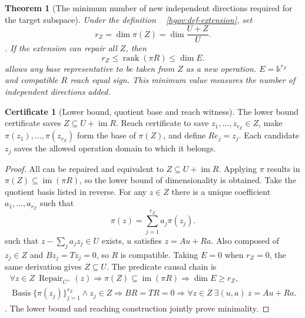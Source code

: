 \documentclass[12pt,a4paper,openany,notitlepage]{report}
\theoremstyle{plain}
\newtheorem{theorem}{Theorem}[chapter]
\theoremstyle{definition}
\newtheorem*{certificate}{Certificate}
\theoremstyle{remark}
\begin{document}
\begin{CJK*}
\begin{theorem}
[The minimum number of new independent directions required for the target subspace]\label{hgov:thm-minimal-extension}
Under the definition ~ \ref{hgov:def-extension}, set \[
 r_Z=\dim\pi(Z)
 =\dim\frac{U+Z}{U}.
\]. If the extension can repair all $Z$, then \[
 r_Z\le\operatorname{rank}(\pi R)\le\dim E.
\] allows any base representative to be taken from $Z$ as a new operation. $E=\mathbb k^{r_Z}$ and compatible $R$ reach equal sign. This minimum value measures the number of independent directions added.\end{theorem}
\begin{certificate}
[Lower bound, quotient base and reach witness]The lower bound certificate saves $Z\subseteq U+\operatorname{im}R$. Reach certificate to save $z_1,\ldots,z_{r_Z}\in Z$, make $\pi(z_1),\ldots,\pi(z_{r_Z})$ form the base of $\pi(Z)$, and define $Re_j=z_j$. Each candidate $z_j$ saves the allowed operation domain to which it belongs.\end{certificate}
\begin{proof}
All can be repaired and equivalent to $Z\subseteq U+\operatorname{im}R$. Applying $\pi$ results in $\pi(Z)\subseteq\operatorname{im}(\pi R)$, so the lower bound of dimensionality is obtained. Take the quotient basis listed in reverse. For any $z\in Z$ there is a unique coefficient $a_1,\ldots,a_{r_Z}$ such that \[
 \pi(z)=\sum_{j=1}^{r_Z}a_j\pi(z_j).
\] such that $z-\sum_j a_jz_j\in U$ exists, $u$ satisfies $z=Au+Ra$. Also composed of $z_j\in Z$ and $Bz_j=Tz_j=0$, so $R$ is compatible. Taking $E=0$ when $r_Z=0$, the same derivation gives $Z\subseteq U$. The predicate causal chain is \[
 \begin{gathered}
 \forall z\in Z\ \operatorname{Repair}_{C^+}(z)
 \Longrightarrow
 \pi(Z)\subseteq\operatorname{im}(\pi R)
 \Longrightarrow \dim E\ge r_Z,\\
 \operatorname{Basis}\{\pi(z_j)\}_{j=1}^{r_Z}
 \wedge z_j\in Z
 \Longrightarrow BR=TR=0
 \Longrightarrow
 \forall z\in Z\ \exists(u,a)\ z=Au+Ra.
 \end{gathered}
\]. The lower bound and reaching construction jointly prove minimality.\end{proof}



\end{CJK*}
\end{document}
